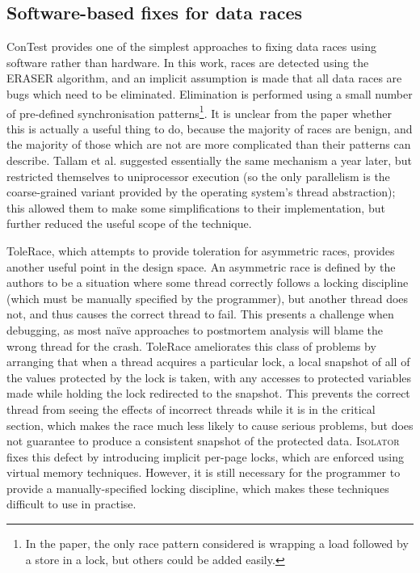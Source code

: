 \subsection{Software-based fixes for data races}
ConTest\cite{Krena2007} provides one of the simplest approaches to
fixing data races using software rather than hardware.  In this work,
races are detected using the ERASER\cite{Savage1997} algorithm, and an
implicit assumption is made that all data races are bugs which need to
be eliminated.  Elimination is performed using a small number of
pre-defined synchronisation patterns\footnote{In the paper, the only
  race pattern considered is wrapping a load followed by a store in a
  lock, but others could be added easily.}.  It is unclear from the
paper whether this is actually a useful thing to do, because the
majority of races are benign, and the majority of those which are not
are more complicated than their patterns can describe.  Tallam et
al.\cite{Tallam2008} suggested essentially the same mechanism a year
later, but restricted themselves to uniprocessor execution (so the
only parallelism is the coarse-grained variant provided by the
operating system's thread abstraction); this allowed them to make some
simplifications to their implementation, but further reduced the
useful scope of the technique.

ToleRace\cite{Kirovski2007}, which attempts to provide toleration for
asymmetric races, provides another useful point in the design space.
An asymmetric race is defined by the authors to be a situation where
some thread correctly follows a locking discipline (which must be
manually specified by the programmer), but another thread does not,
and thus causes the correct thread to fail.  This presents a challenge
when debugging, as most na\"{i}ve approaches to postmortem analysis
will blame the wrong thread for the crash.  ToleRace ameliorates this
class of problems by arranging that when a thread acquires a
particular lock, a local snapshot of all of the values protected by
the lock is taken, with any accesses to protected variables made while
holding the lock redirected to the snapshot.  This prevents the
correct thread from seeing the effects of incorrect threads while it
is in the critical section, which makes the race much less likely to
cause serious problems, but does not guarantee to produce a consistent
snapshot of the protected data.
\textsc{Isolator}\cite{Ramalingam2009} fixes this defect by
introducing implicit per-page locks, which are enforced using virtual
memory techniques.  However, it is still necessary for the programmer
to provide a manually-specified locking discipline, which makes these
techniques difficult to use in practise.

